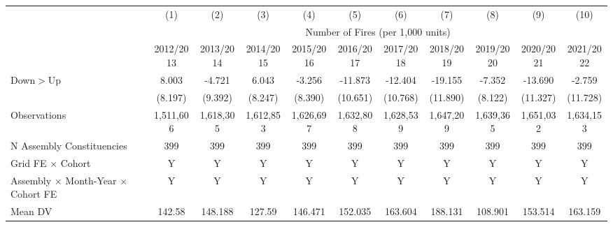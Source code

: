 \begin{tabular}{lcccccccccc} \hline
 & (1) & (2) & (3) & (4) & (5) & (6) & (7) & (8) & (9) & (10) \\
 & \multicolumn{10}{c}{Number of Fires (per 1,000 units)}\\
 & 2012/2013 & 2013/2014 & 2014/2015 & 2015/2016 & 2016/2017 & 2017/2018 & 2018/2019 & 2019/2020 & 2020/2021 & 2021/2022 \\ \hline

Down$>$Up   &       8.003         &      -4.721         &       6.043         &      -3.256         &     -11.873         &     -12.404         &     -19.155         &      -7.352         &     -13.690         &      -2.759         \\
            &     (8.197)         &     (9.392)         &     (8.247)         &     (8.390)         &    (10.651)         &    (10.768)         &    (11.890)         &     (8.122)         &    (11.327)         &    (11.728)         \\
\hline
Observations&   1,511,606         &   1,618,305         &   1,612,853         &   1,626,697         &   1,632,808         &   1,628,539         &   1,647,209         &   1,639,365         &   1,651,032         &   1,634,153         \\
N Assembly Constituencies&         399         &         399         &         399         &         399         &         399         &         399         &         399         &         399         &         399         &         399         \\
Grid FE $\times$ Cohort&           Y         &           Y         &           Y         &           Y         &           Y         &           Y         &           Y         &           Y         &           Y         &           Y         \\
Assembly $\times$ Month-Year $\times$ Cohort FE&           Y         &           Y         &           Y         &           Y         &           Y         &           Y         &           Y         &           Y         &           Y         &           Y         \\
Mean DV     &      142.58         &     148.188         &      127.59         &     146.471         &     152.035         &     163.604         &     188.131         &     108.901         &     153.514         &     163.159         \\
\hline
\end{tabular}
